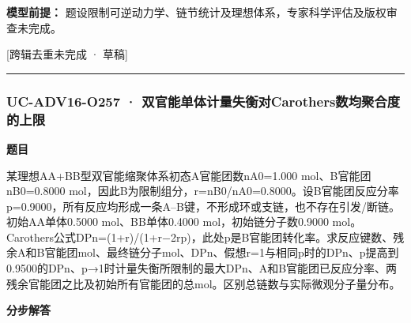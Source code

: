 \documentclass[UTF8,11pt,a4paper]{ctexart}
\begin{document}
\noindent\textbf{模型前提：}
题设限制可逆动力学、链节统计及理想体系，专家科学评估及版权审查未完成。\par
\noindent\textcolor{red!65!black}{[跨辑去重未完成 · 草稿]} \par
\medskip\hrule\medskip
{}
\subsubsection*{UC-ADV16-O257 · 双官能单体计量失衡对Carothers数均聚合度的上限}
\noindent\textbf{题目}\par
某理想AA+BB型双官能缩聚体系初态A官能团数nA0=1.000 mol、B官能团nB0=0.8000 mol，因此B为限制组分，r=nB0/nA0=0.8000。设B官能团反应分率p=0.9000，所有反应均形成一条A–B键，不形成环或支链，也不存在引发/断链。初始AA单体0.5000 mol、BB单体0.4000 mol，初始链分子数0.9000 mol。Carothers公式DPn=(1+r)/(1+r−2rp)，此处p是B官能团转化率。求反应键数、残余A和B官能团mol、最终链分子mol、DPn、假想r=1与相同p时的DPn、p提高到0.9500的DPn、p→1时计量失衡所限制的最大DPn、A和B官能团已反应分率、两残余官能团之比及初始所有官能团的总mol。区别总链数与实际微观分子量分布。\par
\medskip\noindent\textbf{分步解答}
\end{document}

